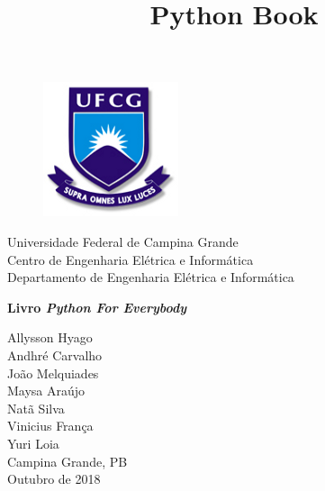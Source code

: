 \documentclass[12pt]{book}
\numberwithin{figure}{section}
\begin{document}
\begin{titlepage}
\title{Python Book}
\begin{figure}
    \centering
    \includegraphics[scale=0.5]{ufcg.png}
\end{figure}
\begin{center}
\begin{large}
Universidade Federal de Campina Grande\\
Centro de Engenharia Elétrica e Informática\\
Departamento de Engenharia Elétrica e Informática\\
\end{large}

\vspace{3cm}

\begin{Large}
\textbf{Livro \textit{Python For Everybody}}

\vspace{0.6cm}

\end{Large}

\vspace*{4cm}
        Allysson Hyago\\
       Andhré Carvalho\\
       João Melquiades\\
       Maysa Araújo\\
       Natã Silva\\
       Vinicius França\\
       Yuri Loia\\
	   \vspace{4cm}
Campina Grande, PB\\
Outubro de 2018

\end{center}

\end{titlepage}





%
\end{document}
